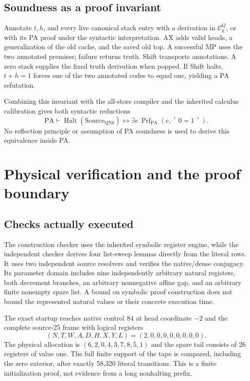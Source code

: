 \documentclass[11pt,letterpaper]{article}
\newcommand{\PA}{\mathrm{PA}}
\newcommand{\Halt}{\operatorname{Halt}}
\newcommand{\Prf}{\operatorname{Prf}}
\begin{document}
\subsection{Soundness as a proof invariant}

Annotate $t,h$, and every live canonical stack entry with a derivation in
$\mathcal C_k^Q$, or with its PA proof under the syntactic interpretation.
AX adds valid heads, a generalization of the old cache, and the saved old top.
A successful MP uses the two annotated premises; failure returns truth. Shift
transports annotations. A zero stack supplies the fixed truth derivation when
popped. If Shift halts, $t+h=1$ forces one of the two annotated codes to equal
one, yielding a PA refutation.

Combining this invariant with the all-store compiler and the inherited
calculus calibration gives both syntactic reductions
\[
 \PA\vdash \Halt(\mathrm{Source}_{\mathrm{QN}k})
       \leftrightarrow \exists e\,\Prf_{\PA}(e,\ulcorner0=1\urcorner).
\]
No reflection principle or assumption of PA soundness is used to derive this
equivalence inside PA.

\section{Physical verification and the proof boundary}
\label{sec:verification}

\subsection{Checks actually executed}



The construction checker uses the inherited symbolic register engine, while
the independent checker derives four list-sweep lemmas directly from the literal
rows. It uses two independent source resolvers and verifies the native/dense
conjugacy. Its parameter domain includes nine independently arbitrary natural
registers, both decrement branches, an arbitrary nonnegative affine gap, and
an arbitrary finite nonempty spare list. A bound on symbolic proof construction
does not bound the represented natural values or their concrete execution time.

The exact startup reaches native control $84$ at head coordinate $-2$ and the
complete source-25 frame with logical registers
\[
 (N,T,W,A,D,H,X,Y,L)=(2,0,0,0,0,0,0,0,0).
\]
The physical allocation is $(6,2,0,4,3,7,8,5,1)$ and the spare tail consists
of 26 registers of value one. The full finite support of the tape is compared,
including the zero exterior, after exactly 58,320 literal transitions.
This is a finite initialization proof, not evidence from a long nonhalting prefix.
\end{document}
